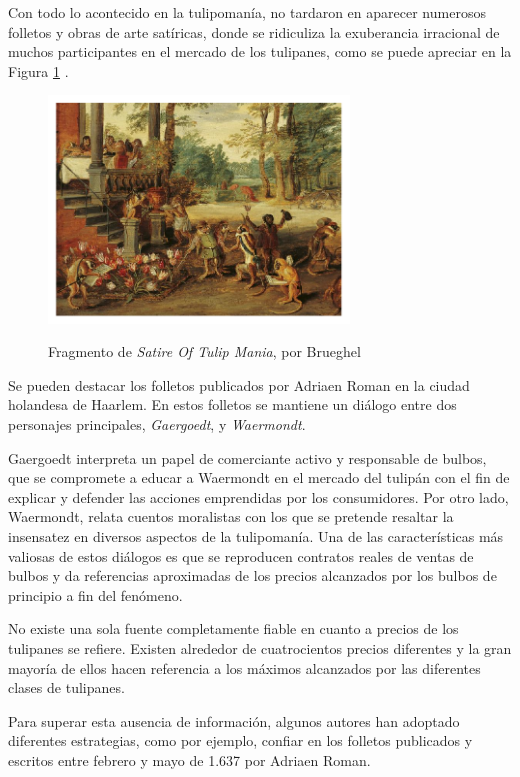 Con todo lo acontecido en la tulipomanía, no tardaron en aparecer numerosos folletos y obras de arte satíricas, donde se ridiculiza la exuberancia irracional de muchos participantes en el mercado de los tulipanes, como se puede apreciar en la Figura \ref{fig:Satire Of Tulip Mania} .


\begin{figure}[!h] 
	\caption{Fragmento de \emph{Satire Of Tulip Mania}, por Brueghel} 
	\centering
	\includegraphics[width=80mm]{capitulos/img/fragmentoSatireOfTulipMania-Brueghel} 
	\label{fig:Satire Of Tulip Mania} 
\end{figure}

Se pueden destacar los folletos publicados por Adriaen Roman en la ciudad holandesa de Haarlem. En estos folletos se mantiene un diálogo entre dos personajes principales, \emph{Gaergoedt}, y \emph{Waermondt}.

Gaergoedt interpreta un papel de comerciante activo y responsable de bulbos, que se compromete a educar a Waermondt en el mercado del tulipán con el fin de explicar y defender las acciones emprendidas por los consumidores. Por otro lado, Waermondt, relata cuentos moralistas con los que se pretende resaltar la insensatez en diversos aspectos de la tulipomanía. Una de las características más valiosas de estos diálogos es que se reproducen contratos reales de ventas de bulbos y da referencias aproximadas de los precios alcanzados por los bulbos de principio a fin del fenómeno.

No existe una sola fuente completamente fiable en cuanto a precios de los tulipanes se refiere. Existen alrededor de cuatrocientos precios diferentes y la gran mayoría de ellos hacen referencia a los máximos alcanzados por las diferentes clases de tulipanes.

Para superar esta ausencia de información, algunos autores han adoptado diferentes estrategias, como por ejemplo, confiar en los folletos publicados y escritos entre febrero y mayo de 1.637 por Adriaen Roman.

